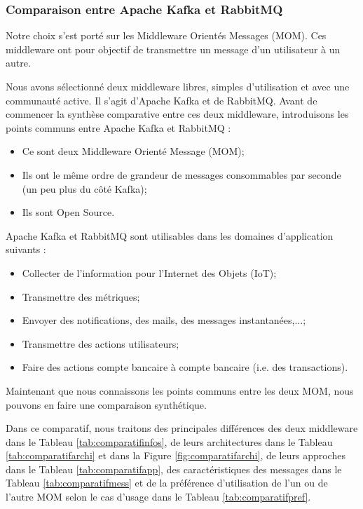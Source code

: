 \documentclass[11pt]{article}
\begin{document}
		\subsubsection{Comparaison entre Apache Kafka et RabbitMQ}\label{sec:comparatif}
			Notre choix s'est porté sur les Middleware Orientés Messages (MOM).
			Ces middleware ont pour objectif de transmettre un message d'un utilisateur à un autre.\par
			Nous avons sélectionné deux middleware libres, simples d'utilisation et avec une communauté active.
			Il s'agit d'Apache Kafka et de RabbitMQ.
			Avant de commencer la synthèse comparative entre ces deux middleware,  introduisons les points communs entre Apache Kafka et RabbitMQ :
			\begin{itemize}
				\item Ce sont deux Middleware Orienté Message (MOM);
				\item Ils ont le même ordre de grandeur de messages consommables par seconde (un peu plus du côté Kafka);
				\item Ils sont Open Source.
			\end{itemize}
			Apache Kafka et RabbitMQ sont utilisables dans les domaines d'application suivants :
			\begin{itemize}
				\item Collecter de l’information pour l'Internet des Objets (IoT);
				\item Transmettre des métriques;
				\item Envoyer des notifications, des mails, des messages instantanées,...;
				\item Transmettre des actions utilisateurs;
				\item Faire des actions compte bancaire à compte bancaire (i.e. des transactions).
			\end{itemize}\par
			Maintenant que nous connaissons les points communs entre les deux MOM, nous pouvons en faire une comparaison synthétique.\par
			Dans ce comparatif, nous traitons des principales différences des deux middleware dans le Tableau \ref{tab:comparatifinfos}, de leurs architectures dans le Tableau \ref{tab:comparatifarchi} et dans la Figure \ref{fig:comparatifarchi}, de leurs approches dans le Tableau \ref{tab:comparatifapp}, des caractéristiques des messages dans le Tableau \ref{tab:comparatifmess} et de la préférence d'utilisation de l'un ou de l'autre MOM selon le cas d'usage dans le Tableau \ref{tab:comparatifpref}.\par
\end{document}
